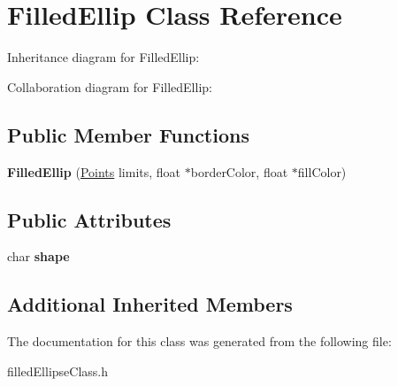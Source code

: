 \hypertarget{classFilledEllip}{}\section{Filled\+Ellip Class Reference}
\label{classFilledEllip}


Inheritance diagram for Filled\+Ellip\+:


Collaboration diagram for Filled\+Ellip\+:
\subsection*{Public Member Functions}
\begin{DoxyCompactItemize}
\item 
{\bfseries Filled\+Ellip} (\hyperlink{structPoints}{Points} limits, float $\ast$border\+Color, float $\ast$fill\+Color)\hypertarget{classFilledEllip_a49b9b1033ba94569caaf24c94528e97a}{}\label{classFilledEllip_a49b9b1033ba94569caaf24c94528e97a}

\end{DoxyCompactItemize}
\subsection*{Public Attributes}
\begin{DoxyCompactItemize}
\item 
char {\bfseries shape}\hypertarget{classFilledEllip_a925d9a8004a847a7d128f6e3e8dcd433}{}\label{classFilledEllip_a925d9a8004a847a7d128f6e3e8dcd433}

\end{DoxyCompactItemize}
\subsection*{Additional Inherited Members}


The documentation for this class was generated from the following file\+:\begin{DoxyCompactItemize}
\item 
filled\+Ellipse\+Class.\+h\end{DoxyCompactItemize}
